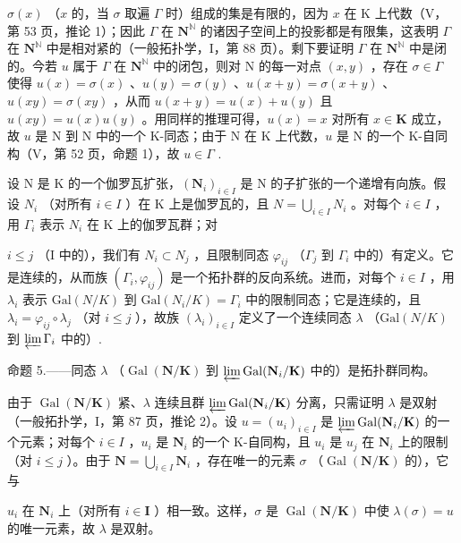 \(\sigma(x)\) （\(x\) 的，当 \(\sigma\) 取遍 \(\Gamma\) 时）组成的集是有限的，因为 \(x\) 在 K 上代数（V，第 53 页，推论 1）；因此 \(\Gamma\) 在 \(\mathbf{N}^{\mathbb{N}}\) 的诸因子空间上的投影都是有限集，这表明 \(\Gamma\) 在 \(\mathbf{N}^{\mathbb{N}}\) 中是相对紧的（一般拓扑学，I，第 88 页）。剩下要证明 \(\Gamma\) 在 \(\mathbf{N}^{\mathbb{N}}\) 中是闭的。今若 \(u\) 属于 \(\Gamma\) 在 \(\mathbf{N}^{\mathbb{N}}\) 中的闭包，则对 N 的每一对点 \((x,y)\) ，存在 \(\sigma \in \Gamma\) 使得 \(u(x) = \sigma(x)\) 、\(u(y) = \sigma(y)\) 、\(u(x + y) = \sigma(x + y)\) 、\(u(xy) = \sigma(xy)\) ，从而 \(u(x + y) = u(x) + u(y)\) 且 \(u(xy) = u(x)u(y)\) 。用同样的推理可得，\(u(x) = x\) 对所有 \(x \in \mathbf{K}\) 成立，故 \(u\) 是 N 到 N 中的一个 K-同态；由于 N 在 K 上代数，\(u\) 是 N 的一个 K-自同构（V，第 52 页，命题 1），故 \(u \in \Gamma\) .

设 N 是 K 的一个伽罗瓦扩张，\((\mathbf{N}_{i})_{i\in I}\) 是 N 的子扩张的一个递增有向族。假设 \(N_{i}\) （对所有 \(i\in I\) ）在 K 上是伽罗瓦的，且 \(N=\bigcup_{i\in I}N_{i}\) 。对每个 \(i\in I\) ，用 \(\Gamma_{i}\) 表示 \(N_{i}\) 在 K 上的伽罗瓦群；对

\(i \leqslant j\) （I 中的），我们有 \(N_i \subset N_j\) ，且限制同态 \(\varphi_{ij}\) （\(\Gamma_j\) 到 \(\Gamma_i\) 中的）有定义。它是连续的，从而族 \((\Gamma_i, \varphi_{ij})\) 是一个拓扑群的反向系统。进而，对每个 \(i \in I\) ，用 \(\lambda_i\) 表示 \(\text{Gal}(N/K)\) 到 \(\text{Gal}(N_i/K) = \Gamma_i\) 中的限制同态；它是连续的，且 \(\lambda_i = \varphi_{ij} \circ \lambda_j\) （对 \(i \leqslant j\) ），故族 \((\lambda_i)_{i \in I}\) 定义了一个连续同态 \(\lambda\) （\(\text{Gal}(N/K)\) 到 \(\varprojlim \Gamma_i\) 中的）.

命题 5.——同态 \(\lambda\) （\(\operatorname{Gal}(\mathbf{N}/\mathbf{K})\) 到 \(\varprojlim \operatorname{Gal}(\mathbf{N}_i/\mathbf{K})\) 中的）是拓扑群同构。

由于 \(\operatorname{Gal}(\mathbf{N}/\mathbf{K})\) 紧、\(\lambda\) 连续且群 \(\varprojlim \operatorname{Gal}(\mathbf{N}_i/\mathbf{K})\) 分离，只需证明 \(\lambda\) 是双射（一般拓扑学，I，第 87 页，推论 2）。设 \(u = (u_i)_{i \in I}\) 是 \(\varprojlim \operatorname{Gal}(\mathbf{N}_i/\mathbf{K})\) 的一个元素；对每个 \(i \in I\) ，\(u_i\) 是 \(\mathbf{N}_i\) 的一个 K-自同构，且 \(u_i\) 是 \(u_j\) 在 \(\mathbf{N}_i\) 上的限制（对 \(i \leqslant j\) ）。由于 \(\mathbf{N} = \bigcup_{i \in I} \mathbf{N}_i\) ，存在唯一的元素 \(\sigma\) （\(\operatorname{Gal}(\mathbf{N}/\mathbf{K})\) 的），它与

\(u_{i}\) 在 \(\mathbf{N}_i\) 上（对所有 \(i\in \mathbf{I}\) ）相一致。这样，\(\sigma\) 是 \(\operatorname {Gal}(\mathbf{N} / \mathbf{K})\) 中使 \(\lambda (\sigma) = u\) 的唯一元素，故 \(\lambda\) 是双射。

